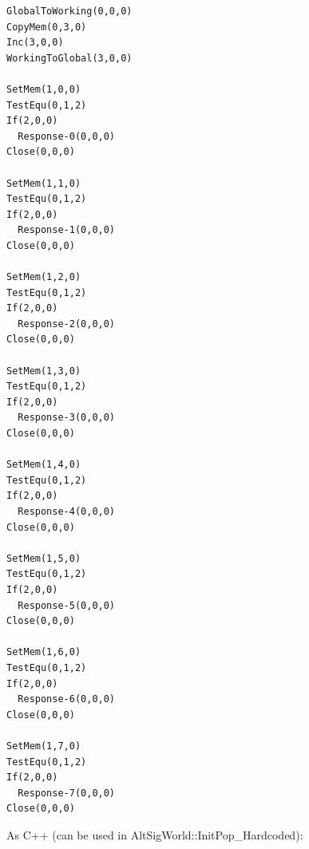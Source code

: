 \documentclass[]{book}
\begin{document}
\begin{verbatim}
GlobalToWorking(0,0,0)
CopyMem(0,3,0)
Inc(3,0,0)
WorkingToGlobal(3,0,0)

SetMem(1,0,0)
TestEqu(0,1,2)
If(2,0,0)
  Response-0(0,0,0)
Close(0,0,0)

SetMem(1,1,0)
TestEqu(0,1,2)
If(2,0,0)
  Response-1(0,0,0)
Close(0,0,0)

SetMem(1,2,0)
TestEqu(0,1,2)
If(2,0,0)
  Response-2(0,0,0)
Close(0,0,0)

SetMem(1,3,0)
TestEqu(0,1,2)
If(2,0,0)
  Response-3(0,0,0)
Close(0,0,0)

SetMem(1,4,0)
TestEqu(0,1,2)
If(2,0,0)
  Response-4(0,0,0)
Close(0,0,0)

SetMem(1,5,0)
TestEqu(0,1,2)
If(2,0,0)
  Response-5(0,0,0)
Close(0,0,0)

SetMem(1,6,0)
TestEqu(0,1,2)
If(2,0,0)
  Response-6(0,0,0)
Close(0,0,0)

SetMem(1,7,0)
TestEqu(0,1,2)
If(2,0,0)
  Response-7(0,0,0)
Close(0,0,0)
\end{verbatim}

As C++ (can be used in AltSigWorld::InitPop\_Hardcoded):
\end{document}
